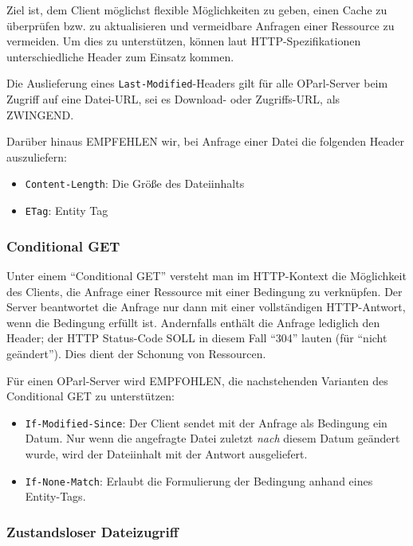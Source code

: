 \documentclass[,a4paper]{article}
\begin{document}
Ziel ist, dem Client möglichst flexible Möglichkeiten zu geben, einen
Cache zu überprüfen bzw. zu aktualisieren und vermeidbare Anfragen einer
Ressource zu vermeiden. Um dies zu unterstützen, können laut
HTTP-Spezifikationen unterschiedliche Header zum Einsatz kommen.

Die Auslieferung eines \texttt{Last-Modified}-Headers gilt für alle
OParl-Server beim Zugriff auf eine Datei-URL, sei es Download- oder
Zugriffs-URL, als ZWINGEND.

Darüber hinaus EMPFEHLEN wir, bei Anfrage einer Datei die folgenden
Header auszuliefern:

\begin{itemize}
\itemsep1pt\parskip0pt
\item
  \texttt{Content-Length}: Die Größe des Dateiinhalts
\item
  \texttt{ETag}: Entity Tag
\end{itemize}

\subsubsection{Conditional GET}\label{conditional-get}

Unter einem ``Conditional GET'' versteht man im HTTP-Kontext die
Möglichkeit des Clients, die Anfrage einer Ressource mit einer Bedingung
zu verknüpfen. Der Server beantwortet die Anfrage nur dann mit einer
vollständigen HTTP-Antwort, wenn die Bedingung erfüllt ist. Andernfalls
enthält die Anfrage lediglich den Header; der HTTP Status-Code SOLL in
diesem Fall ``304'' lauten (für ``nicht geändert''). Dies dient der
Schonung von Ressourcen.

Für einen OParl-Server wird EMPFOHLEN, die nachstehenden Varianten des
Conditional GET zu unterstützen:

\begin{itemize}
\item
  \texttt{If-Modified-Since}: Der Client sendet mit der Anfrage als
  Bedingung ein Datum. Nur wenn die angefragte Datei zuletzt \emph{nach}
  diesem Datum geändert wurde, wird der Dateiinhalt mit der Antwort
  ausgeliefert.
\item
  \texttt{If-None-Match}: Erlaubt die Formulierung der Bedingung anhand
  eines Entity-Tags.
\end{itemize}

\subsubsection{Zustandsloser
Dateizugriff}\label{zustandsloser-dateizugriff}
\end{document}
